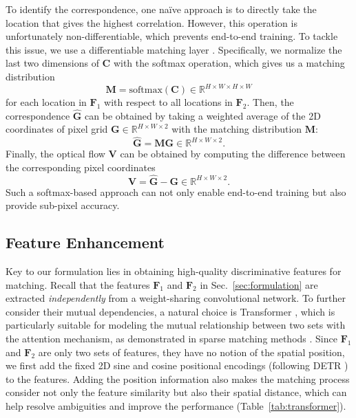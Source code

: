 \documentclass[10pt,twocolumn,letterpaper]{article}
\begin{document}
To identify the correspondence, one na\"ive approach is to directly take the location that gives the highest correlation. However, this operation is unfortunately non-differentiable, which prevents end-to-end training. To tackle this issue, we use a differentiable matching layer \cite{wang2020learning,kendall2017end,xu2020aanet}. Specifically, we normalize the last two dimensions of ${\bm C}$ with the softmax operation, which gives us a matching distribution
\begin{equation}
    {\bm M} = \mathrm{softmax} ({\bm C}) \in \mathbb{R}^{H \times W \times H \times W}
\end{equation}
for each location in ${\bm F}_1$ with respect to all locations in ${\bm F}_2$. Then, the correspondence $\hat{{\bm G}}$ can be obtained by taking a weighted average of the 2D coordinates of pixel grid ${\bm G} \in \mathbb{R}^{H \times W \times 2}$ with the matching distribution ${\bm M}$:
\begin{equation}
    \hat{{\bm G}} = {\bm M} {\bm G} \in \mathbb{R}^{H \times W \times 2}.
\end{equation}
Finally, the optical flow ${\bm V}$ can be obtained by computing the difference between the corresponding pixel coordinates
\begin{equation}
{\bm V} = \hat{{\bm G}}  - {\bm G} \in \mathbb{R}^{H \times W \times 2}.
\end{equation}
Such a softmax-based approach can not only enable end-to-end training but also provide sub-pixel accuracy. 










\subsection{Feature Enhancement}

Key to our formulation lies in obtaining high-quality discriminative features for matching. Recall that the features ${\bm F}_1$ and ${\bm F}_2$ in Sec.~\ref{sec:formulation} are extracted \emph{independently} from a weight-sharing convolutional network. To further consider their mutual dependencies, a natural choice is Transformer \cite{vaswani2017attention}, which is particularly suitable for modeling the mutual relationship between two sets with the attention mechanism, as demonstrated in sparse matching methods \cite{sarlin2020superglue,sun2021loftr}.
Since ${\bm F}_1$ and ${\bm F}_2$ are only two sets of features, they have no notion of the spatial position, we first add the fixed 2D sine and cosine positional encodings (following DETR \cite{carion2020end}) to the features. Adding the position information also makes the matching process consider not only the feature similarity but also their spatial distance, which can help resolve ambiguities and improve the performance (Table~\ref{tab:transformer}).
\end{document}
